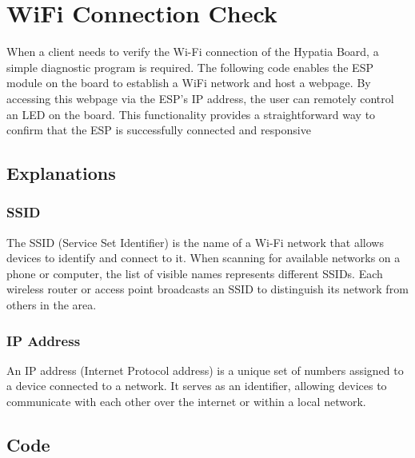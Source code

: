 %
\chapter{WiFi Connection Check}
When a client needs to verify the Wi-Fi connection of the Hypatia Board, a simple diagnostic program is required. The following code enables the ESP module on the board to establish a WiFi network and host a webpage. By accessing this webpage via the ESP's IP address, the user can remotely control an LED on the board. This functionality provides a straightforward way to confirm that the ESP is successfully connected and responsive

\section{Explanations}
\subsection{SSID}
The SSID (Service Set Identifier) is the name of a Wi-Fi network that allows devices to identify and connect to it. When scanning for available networks on a phone or computer, the list of visible names represents different SSIDs. Each wireless router or access point broadcasts an SSID to distinguish its network from others in the area.

\subsection{IP Address}
An IP address (Internet Protocol address) is a unique set of numbers assigned to a device connected to a network. It serves as an identifier, allowing devices to communicate with each other over the internet or within a local network.

\section{Code}



